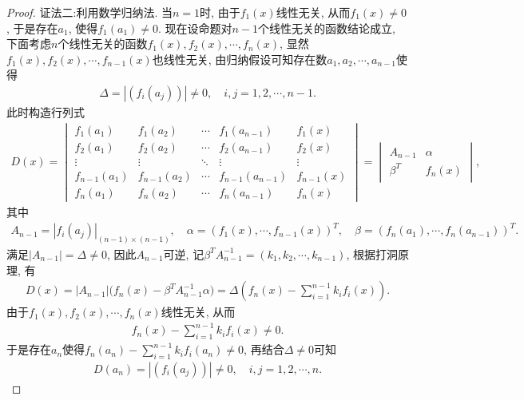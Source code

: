 \documentclass[../../main.tex]{subfiles}%
\begin{document}
\begin{proof}
{\color{blue}证法二:}利用数学归纳法. 当$n = 1$时, 由于$f_1(x)$线性无关, 从而$f_1(x) \neq 0$, 于是存在$a_1$, 使得$f_1(a_1) \neq 0$. 
现在设命题对$n-1$个线性无关的函数结论成立, 下面考虑$n$个线性无关的函数$f_1(x), f_2(x), \cdots, f_n(x)$, 显然$f_1(x), f_2(x), \cdots, f_{n-1}(x)$也线性无关, 由归纳假设可知存在数$a_1, a_2, \cdots, a_{n-1}$使得
\begin{align*}
\Delta = \left| (f_i(a_j)) \right| \neq 0, \quad i, j = 1, 2, \cdots, n-1.
\end{align*}
此时构造行列式
\begin{align*}
D(x) = 
\begin{vmatrix}
f_1(a_1) & f_1(a_2) & \cdots & f_1(a_{n-1}) & f_1(x) \\
f_2(a_1) & f_2(a_2) & \cdots & f_2(a_{n-1}) & f_2(x) \\
\vdots & \vdots & \ddots & \vdots & \vdots \\
f_{n-1}(a_1) & f_{n-1}(a_2) & \cdots & f_{n-1}(a_{n-1}) & f_{n-1}(x) \\
f_n(a_1) & f_n(a_2) & \cdots & f_n(a_{n-1}) & f_n(x)
\end{vmatrix}
= 
\begin{vmatrix}
A_{n-1} & \alpha \\
\beta^T & f_n(x)
\end{vmatrix},
\end{align*}
其中
\begin{align*}
A_{n-1} = |f_i(a_j)|_{(n-1) \times (n-1)}, \quad \alpha = (f_1(x), \cdots, f_{n-1}(x))^T, \quad \beta = (f_n(a_1), \cdots, f_n(a_{n-1}))^T.
\end{align*}
满足$|A_{n-1}| = \Delta \neq 0$, 因此$A_{n-1}$可逆, 记$\beta^T A_{n-1}^{-1} = (k_1, k_2, \cdots, k_{n-1})$, 根据打洞原理, 有
\begin{align*}
D(x) = |A_{n-1}| \bigl( f_n(x) - \beta^T A_{n-1}^{-1} \alpha \bigr) = \Delta \left( f_n(x) - \sum_{i=1}^{n-1} k_i f_i(x) \right).
\end{align*}
由于$f_1(x), f_2(x), \cdots, f_n(x)$线性无关, 从而
\begin{align*}
f_n(x) - \sum_{i=1}^{n-1} k_i f_i(x) \neq 0.
\end{align*}
于是存在$a_n$使得$f_n(a_n) - \sum_{i=1}^{n-1} k_i f_i(a_n) \neq 0$, 再结合$\Delta \neq 0$可知
\begin{align*}
D(a_n) = \left| (f_i(a_j)) \right| \neq 0, \quad i, j = 1, 2, \cdots, n.
\end{align*}
\end{proof}
\end{document}
